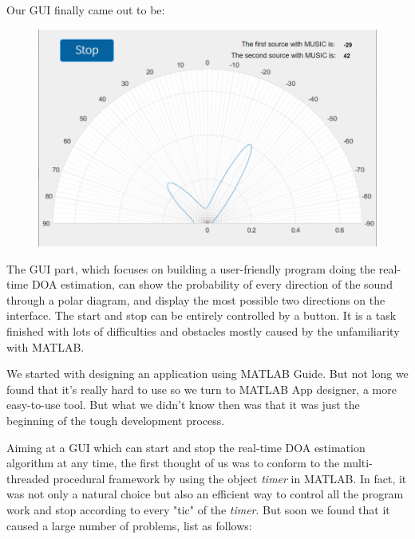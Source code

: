 \documentclass[UTF8]{article}
\begin{document}
\hspace{0.5em} Our GUI finally came out to be:
\begin{figure}[H]
    \centering
    \includegraphics[scale=0.45]{img/GUI.png}
\end{figure}

The GUI part, which focuses on building a user-friendly program doing
the real-time DOA estimation, can show the probability of every
direction of the sound through a polar diagram, and display the most
possible two directions on the interface. The start and stop can be
entirely controlled by a button. It is a task finished with lots of
difficulties and obstacles mostly caused by the unfamiliarity with
MATLAB.

We started with designing an application using MATLAB Guide. But not
long we found that it's really hard to use so we turn to MATLAB App
designer, a more easy-to-use tool. But what we didn't know then was that
it was just the beginning of the tough development process.

Aiming at a GUI which can start and stop the real-time DOA estimation
algorithm at any time, the first thought of us was to conform to the
multi-threaded procedural framework by using the object \emph{timer}
in MATLAB. In fact, it was not only a natural choice but also an
efficient way to control all the program work and stop according to
every "tic" of the \emph{timer}. But soon we found that it caused a
large number of problems, list as follows:
\end{document}
